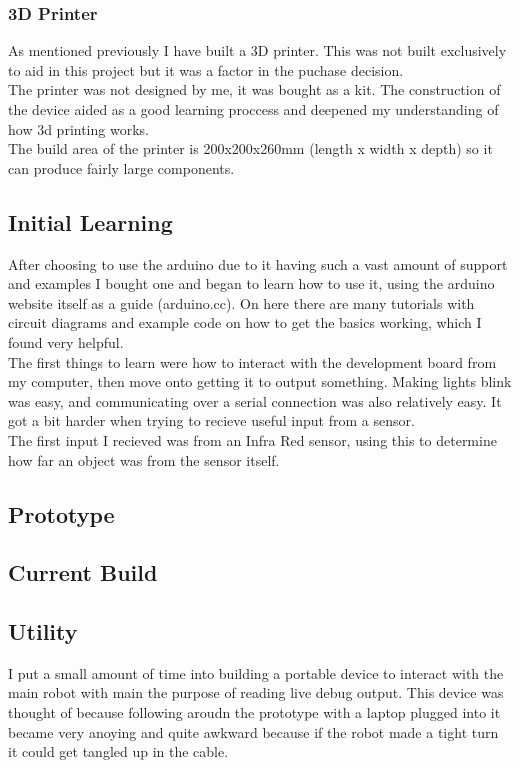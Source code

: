 \documentclass[11pt,fleqn,twoside]{article}
\begin{document}
\subsubsection{3D Printer}
As mentioned previously I have built a 3D printer.  This was not built exclusively to aid in this project but it was a factor in the puchase decision.
\\The printer was not designed by me, it was bought as a kit.  The construction of the device aided as a good learning proccess and deepened my understanding of how 3d printing works.
\\The build area of the printer is 200x200x260mm (length x width x depth) so it can produce fairly large components.



\subsection{Initial Learning}
After choosing to use the arduino due to it having such a vast amount of support and examples I bought one and began to learn how to use it, using the arduino website itself as a guide (arduino.cc).  On here there are many tutorials with circuit diagrams and example code on how to get the basics working, which I found very helpful.
\\The first things to learn were how to interact with the development board from my computer, then move onto getting it to output something.  Making lights blink was easy, and communicating over a serial connection was also relatively easy.  It got a bit harder when trying to recieve useful input from a sensor.
\\The first input I recieved was from an Infra Red sensor, using this to determine how far an object was from the sensor itself.

\subsection{Prototype}


\subsection{Current Build}

\subsection{Utility}
I put a small amount of time into building a portable device to interact with the main robot with main the purpose of reading live debug output.  This device was thought of because following aroudn the prototype with a laptop plugged into it became very anoying and quite awkward because if the robot made a tight turn it could get tangled up in the cable.
\end{document}
